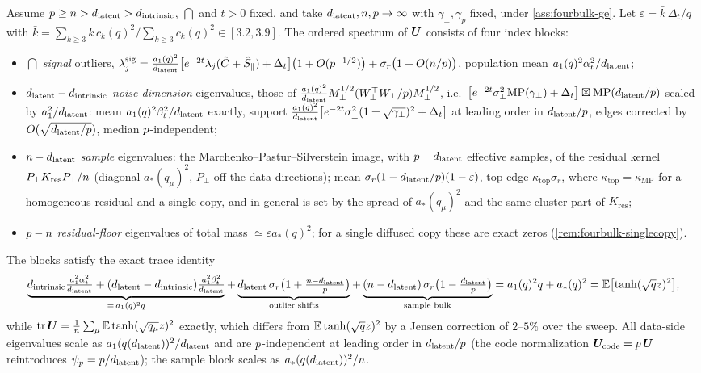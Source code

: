 \begin{proposition}\label{prop:fourbulk}
Assume $p\ge n>d_{\mathrm{latent}}>d_{\mathrm{intrinsic}}$, $\dint$ and $t>0$ fixed, and take $d_{\mathrm{latent}},n,p\to\infty$ with $\gamma_\perp,\gamma_p$ fixed, under \cref{ass:fourbulk-ge}. Let $\varepsilon=\bar k\,\Delta_t/q$ with $\bar k=\sum_{k\ge3}k\,c_k(q)^2/\sum_{k\ge3}c_k(q)^2\in[3.2,3.9]$. The ordered spectrum of $\bm{U}$ consists of four index blocks:
\begin{itemize}
\item[(i)] $\dint$ \emph{signal} outliers, $\lambda^{\mathrm{sig}}_j=\tfrac{a_1(q)^2}{d_{\mathrm{latent}}}\bigl[e^{-2t}\lambda_j(\hat C+\hat S_\parallel)+\Delta_t\bigr]\bigl(1+O(p^{-1/2})\bigr)+\sigma_r\bigl(1+O(n/p)\bigr)$, population mean $a_1(q)^2\alpha_t^2/d_{\mathrm{latent}}$;
\item[(ii)] $d_{\mathrm{latent}}-d_{\mathrm{intrinsic}}$ \emph{noise-dimension} eigenvalues, those of $\tfrac{a_1(q)^2}{d_{\mathrm{latent}}}M_\perp^{1/2}(W_\perp^\top W_\perp/p)M_\perp^{1/2}$, i.e.\ $\bigl[e^{-2t}\sigma_{\perp}^2\mathrm{MP}(\gamma_\perp)+\Delta_t\bigr]\boxtimes\mathrm{MP}(d_{\mathrm{latent}}/p)$ scaled by $a_1^2/d_{\mathrm{latent}}$: mean $a_1(q)^2\beta_t^2/d_{\mathrm{latent}}$ exactly, support $\tfrac{a_1(q)^2}{d_{\mathrm{latent}}}\bigl[e^{-2t}\sigma_{\perp}^2(1\pm\sqrt{\gamma_\perp})^2+\Delta_t\bigr]$ at leading order in $d_{\mathrm{latent}}/p$, edges corrected by $O(\sqrt{d_{\mathrm{latent}}/p})$, median $p$-independent;
\item[(iii)] $n-d_{\mathrm{latent}}$ \emph{sample} eigenvalues: the Marchenko--Pastur--Silverstein image, with $p-d_{\mathrm{latent}}$ effective samples, of the residual kernel $P_\perp K_{\mathrm{res}}P_\perp/n$ (diagonal $a_*(q_\mu)^2$, $P_\perp$ off the data directions); mean $\sigma_r(1-d_{\mathrm{latent}}/p)(1-\varepsilon)$, top edge $\kappa_{\mathrm{top}}\sigma_r$, where $\kappa_{\mathrm{top}}=\kappa_{\mathrm{MP}}$ for a homogeneous residual and a single copy, and in general is set by the spread of $a_*(q_\mu)^2$ and the same-cluster part of $K_{\mathrm{res}}$;
\item[(iv)] $p-n$ \emph{residual-floor} eigenvalues of total mass $\simeq\varepsilon a_*(q)^2$; for a single diffused copy these are exact zeros (\cref{rem:fourbulk-singlecopy}).
\end{itemize}
The blocks satisfy the exact trace identity
\begin{align}\label{eq:fourbulk-trace}
  \underbrace{d_{\mathrm{intrinsic}}\tfrac{a_1^2\alpha_t^2}{d_{\mathrm{latent}}}+(d_{\mathrm{latent}}-d_{\mathrm{intrinsic}})\tfrac{a_1^2\beta_t^2}{d_{\mathrm{latent}}}}_{=\,a_1(q)^2q}
  +\underbrace{d_{\mathrm{latent}}\,\sigma_r\bigl(1+\tfrac{n-d_{\mathrm{latent}}}{p}\bigr)}_{\text{outlier shifts}}+\underbrace{(n-d_{\mathrm{latent}})\,\sigma_r\bigl(1-\tfrac{d_{\mathrm{latent}}}{p}\bigr)}_{\text{sample bulk}}
  =a_1(q)^2q+a_*(q)^2=\mathbb{E}\bigl[\tanh(\sqrt q z)^2\bigr],
\end{align}
while $\operatorname{tr}\bm{U}=\tfrac1{n}\sum_\mu\mathbb{E}\tanh(\sqrt{q_\mu}z)^2$ exactly, which differs from $\mathbb{E}\tanh(\sqrt qz)^2$ by a Jensen correction of $2$--$5\%$ over the sweep. All data-side eigenvalues scale as $a_1(q(d_{\mathrm{latent}}))^2/d_{\mathrm{latent}}$ and are $p$-independent at leading order in $d_{\mathrm{latent}}/p$ (the code normalization $\bm{U}_{\mathrm{code}}=p\,\bm{U}$ reintroduces $\psi_p=p/d_{\mathrm{latent}}$); the sample block scales as $a_*(q(d_{\mathrm{latent}}))^2/n$.
\end{proposition}
